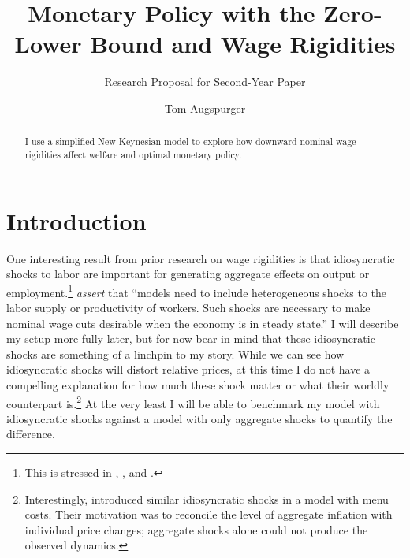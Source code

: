 \documentclass[12pt,a4paper]{scrartcl}            %
\begin{document}
\makeatletter
\def\blfootnote{\xdef\@thefnmark{}\@footnotetext}
\makeatother



\title{Monetary Policy with the Zero-Lower Bound and Wage Rigidities}
\subtitle{Research Proposal for Second-Year Paper}
\author{Tom Augspurger}                               %


\begin{abstract}
I use a simplified New Keynesian model to explore how downward nominal wage rigidities affect welfare and optimal monetary policy.

\end{abstract}

\section{Introduction}
\label{sec:introduction}

One interesting result from prior research on wage rigidities is that idiosyncratic shocks to labor are important for generating aggregate effects on output or employment.\footnote{
This is stressed in \cite{elsby_2009}, \cite{benigno_ricci_2011}, and \cite{daly_hobijn_2013}.}
\cite{daly_hobijn_2013} \emph{assert} that ``models need to include heterogeneous shocks to the labor supply or productivity of workers. Such shocks are necessary to make nominal wage cuts desirable when the economy is in steady state.''
I will describe my setup more fully later, but for now bear in mind that these idiosyncratic shocks are something of a linchpin to my story.
While we can see how idiosyncratic shocks will distort relative prices, at this time I do not have a compelling explanation for how much these shock matter or what their worldly counterpart is.\footnote{
Interestingly, \cite{golosov_lucas_2007} introduced similar idiosyncratic shocks in a model with menu costs.
Their motivation was to reconcile the level of aggregate inflation with individual price changes;
aggregate shocks alone could not produce the observed dynamics.
}
At the very least I will be able to benchmark my model with idiosyncratic shocks against a model with only aggregate shocks to quantify the difference.
\end{document}
